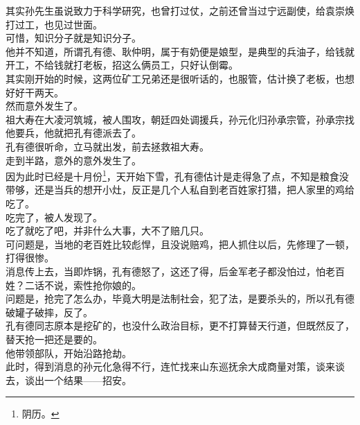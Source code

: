 \begin{multicols}{\theparacolNo}
其实孙先生虽说致力于科学研究，也曾打过仗，之前还曾当过宁远副使，给袁崇焕打过工，也见过世面。\\

可惜，知识分子就是知识分子。\\

他并不知道，所谓孔有德、耿仲明，属于有奶便是娘型，是典型的兵油子，给钱就开工，不给钱就打老板，招这么俩员工，只好认倒霉。\\

其实刚开始的时候，这两位矿工兄弟还是很听话的，也服管，估计换了老板，也想好好干两天。\\

然而意外发生了。\\

祖大寿在大凌河筑城，被人围攻，朝廷四处调援兵，孙元化归孙承宗管，孙承宗找他要兵，他就把孔有德派去了。\\

孔有德很听命，立马就出发，前去拯救祖大寿。\\

走到半路，意外的意外发生了。\\

因为此时已经是十月份\footnote{阴历。}，天开始下雪，孔有德估计是走得急了点，不知是粮食没带够，还是当兵的想开小灶，反正是几个人私自到老百姓家打猎，把人家里的鸡给吃了。\\

吃完了，被人发现了。\\

吃了就吃了吧，并非什么大事，大不了赔几只。\\

可问题是，当地的老百姓比较彪悍，且没说赔鸡，把人抓住以后，先修理了一顿，打得很惨。\\

消息传上去，当即炸锅，孔有德怒了，这还了得，后金军老子都没怕过，怕老百姓？二话不说，索性抢你娘的。\\

问题是，抢完了怎么办，毕竟大明是法制社会，犯了法，是要杀头的，所以孔有德破罐子破摔，反了。\\

孔有德同志原本是挖矿的，也没什么政治目标，更不打算替天行道，但既然反了，替天抢一把还是要的。\\

他带领部队，开始沿路抢劫。\\

此时，得到消息的孙元化急得不行，连忙找来山东巡抚余大成商量对策，谈来谈去，谈出一个结果——招安。\\


\end{multicols}
